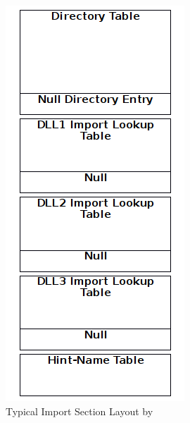 \begin{figure}
\centering
\includegraphics[width=.98\textwidth, height=.60\textheight,keepaspectratio]{graphics/importsection}
\caption{Typical Import Section Layout by }
\label{fig:import} 
\end{figure}

